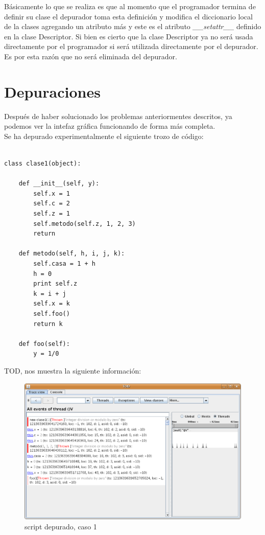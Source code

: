 \documentclass[10pt,a4paper]{article}
\begin{document}
Básicamente lo que se realiza es que al momento que el programador termina de definir su clase el depurador toma esta definición y modifica el diccionario local de la clases agregando un atributo más y este es el atributo \textit{\_\_setattr\_\_} definido en la clase Descriptor.  Si bien es cierto que la clase Descriptor ya no será usada directamente por el programador si será utilizada directamente por el depurador.  Es por esta razón que no será eliminada del depurador.


\newpage
\section{Depuraciones}

Después de haber solucionado los problemas anteriormentes descritos, ya podemos ver la intefaz gráfica funcionando de forma más completa.\\

Se ha depurado experimentalmente el siguiente trozo de código:\\

\begin{verbatim}
    
class clase1(object):
    
    def __init__(self, y):
        self.x = 1
        self.c = 2
        self.z = 1
        self.metodo(self.z, 1, 2, 3)
        return
    
    def metodo(self, h, i, j, k):
        self.casa = 1 + h
        h = 0
        print self.z
        k = i + j
        self.x = k
        self.foo()
        return k
    
    def foo(self):
        y = 1/0
\end{verbatim}

TOD, nos muestra la siguiente información:\\

\begin{figure}[hpb]
	\centering
	\includegraphics[scale=0.3]{images/TOD-1.eps}
	\caption{script depurado, caso 1}
\end{figure}
\end{document}

